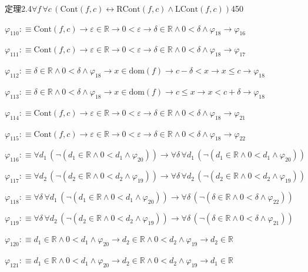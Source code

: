 \begin{fullproof}{定理2.4}{$\forall f\,\forall c\,(\mathrm{Cont}(f,c) \leftrightarrow \mathrm{RCont}(f,c) \land \mathrm{LCont}(f,c))$}{450}
\begin{abbrevlist}
\item $\varphi_{110} :\equiv \mathrm{Cont}(f,c) \to \varepsilon \in \mathbb{R} \to 0 < \varepsilon \to \delta \in \mathbb{R} \land 0 < \delta \land \varphi_{18} \to \varphi_{16}$
\item $\varphi_{111} :\equiv \mathrm{Cont}(f,c) \to \varepsilon \in \mathbb{R} \to 0 < \varepsilon \to \delta \in \mathbb{R} \land 0 < \delta \land \varphi_{18} \to \varphi_{17}$
\item $\varphi_{112} :\equiv \delta \in \mathbb{R} \land 0 < \delta \land \varphi_{18} \to x \in \mathrm{dom}(f) \to c - \delta < x \to x \leq c \to \varphi_{18}$
\item $\varphi_{113} :\equiv \delta \in \mathbb{R} \land 0 < \delta \land \varphi_{18} \to x \in \mathrm{dom}(f) \to c \leq x \to x < c + \delta \to \varphi_{18}$
\item $\varphi_{114} :\equiv \mathrm{Cont}(f,c) \to \varepsilon \in \mathbb{R} \to 0 < \varepsilon \to \delta \in \mathbb{R} \land 0 < \delta \land \varphi_{18} \to \varphi_{21}$
\item $\varphi_{115} :\equiv \mathrm{Cont}(f,c) \to \varepsilon \in \mathbb{R} \to 0 < \varepsilon \to \delta \in \mathbb{R} \land 0 < \delta \land \varphi_{18} \to \varphi_{22}$
\item $\varphi_{116} :\equiv \forall d_{1}\,(\neg (d_{1} \in \mathbb{R} \land 0 < d_{1} \land \varphi_{20})) \to \forall \delta\,\forall d_{1}\,(\neg (d_{1} \in \mathbb{R} \land 0 < d_{1} \land \varphi_{20}))$
\item $\varphi_{117} :\equiv \forall d_{2}\,(\neg (d_{2} \in \mathbb{R} \land 0 < d_{2} \land \varphi_{19})) \to \forall \delta\,\forall d_{2}\,(\neg (d_{2} \in \mathbb{R} \land 0 < d_{2} \land \varphi_{19}))$
\item $\varphi_{118} :\equiv \forall \delta\,\forall d_{1}\,(\neg (d_{1} \in \mathbb{R} \land 0 < d_{1} \land \varphi_{20})) \to \forall \delta\,(\neg (\delta \in \mathbb{R} \land 0 < \delta \land \varphi_{22}))$
\item $\varphi_{119} :\equiv \forall \delta\,\forall d_{2}\,(\neg (d_{2} \in \mathbb{R} \land 0 < d_{2} \land \varphi_{19})) \to \forall \delta\,(\neg (\delta \in \mathbb{R} \land 0 < \delta \land \varphi_{21}))$
\item $\varphi_{120} :\equiv d_{1} \in \mathbb{R} \land 0 < d_{1} \land \varphi_{20} \to d_{2} \in \mathbb{R} \land 0 < d_{2} \land \varphi_{19} \to d_{2} \in \mathbb{R}$
\item $\varphi_{121} :\equiv d_{1} \in \mathbb{R} \land 0 < d_{1} \land \varphi_{20} \to d_{2} \in \mathbb{R} \land 0 < d_{2} \land \varphi_{19} \to d_{1} \in \mathbb{R}$

\end{abbrevlist}
\end{fullproof}
